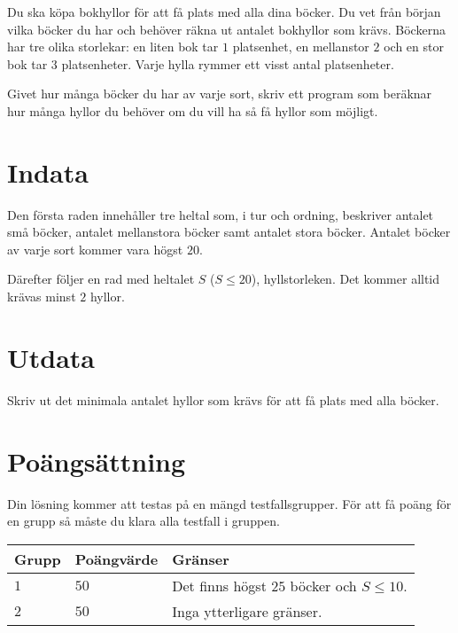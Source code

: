 Du ska köpa bokhyllor för att få plats med alla dina böcker.
Du vet från början vilka böcker du har och behöver räkna ut antalet bokhyllor som krävs.
Böckerna har tre olika storlekar: en liten bok tar $1$ platsenhet, en mellanstor $2$ och en stor bok tar $3$ platsenheter.
Varje hylla rymmer ett visst antal platsenheter.

Givet hur många böcker du har av varje sort, skriv ett program som beräknar hur många hyllor du behöver om du vill ha så få hyllor som möjligt.

\section*{Indata}
Den första raden innehåller tre heltal som, i tur och ordning, beskriver antalet små böcker, antalet mellanstora böcker samt antalet stora böcker.
Antalet böcker av varje sort kommer vara högst $20$.

Därefter följer en rad med heltalet $S$ ($S \le 20$), hyllstorleken.
Det kommer alltid krävas minst $2$ hyllor.

\section*{Utdata}
Skriv ut det minimala antalet hyllor som krävs för att få plats med alla böcker.

\section*{Poängsättning}
Din lösning kommer att testas på en mängd testfallsgrupper.
För att få poäng för en grupp så måste du klara alla testfall i gruppen.

\noindent
\begin{tabular}{| l | l | p{12cm} |}
  \hline
  Grupp & Poängvärde & Gränser \\ \hline
  $1$    & $50$        & Det finns högst $25$ böcker och $S \le 10$. \\ \hline 
  $2$    & $50$        & Inga ytterligare gränser. \\ \hline 
\end{tabular}

